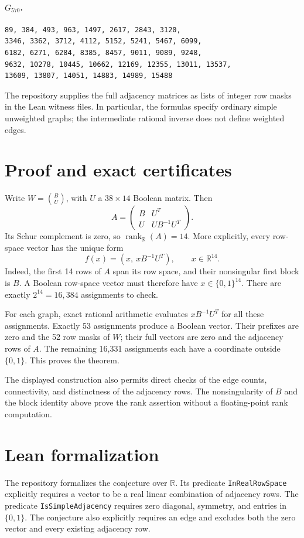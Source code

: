 \documentclass[11pt]{article}
\begin{document}
\paragraph{$G_{570}$.}
\begin{Verbatim}[fontsize=\small]
89, 384, 493, 963, 1497, 2617, 2843, 3120,
3346, 3362, 3712, 4112, 5152, 5241, 5467, 6099,
6182, 6271, 6284, 8385, 8457, 9011, 9089, 9248,
9632, 10278, 10445, 10662, 12169, 12355, 13011, 13537,
13609, 13807, 14051, 14883, 14989, 15488
\end{Verbatim}
The repository supplies the full adjacency matrices as lists of integer row masks in the Lean witness files. In particular, the formulas specify ordinary simple unweighted graphs; the intermediate rational inverse does not define weighted edges.
\newpage

\section*{Proof and exact certificates}
Write $W=\binom{B}{U}$, with $U$ a $38\times14$ Boolean matrix. Then
\[
 A=\begin{pmatrix}B&U^T\\U&UB^{-1}U^T\end{pmatrix}.
\]
Its Schur complement is zero, so $\operatorname{rank}_{\mathbb R}(A)=14$.
More explicitly, every row-space vector has the unique form
\[
                 f(x)=(x,\ xB^{-1}U^T),\qquad x\in\mathbb R^{14}.
\]
Indeed, the first 14 rows of $A$ span its row space, and their nonsingular first block is $B$. A Boolean row-space vector must therefore have $x\in\{0,1\}^{14}$. There are exactly $2^{14}=16,384$ assignments to check.
\par\medskip
For each graph, exact rational arithmetic evaluates $xB^{-1}U^T$ for all these assignments. Exactly 53 assignments produce a Boolean vector. Their prefixes are zero and the 52 row masks of $W$; their full vectors are zero and the adjacency rows of $A$. The remaining 16,331 assignments each have a coordinate outside $\{0,1\}$. This proves the theorem.
\par\medskip
The displayed construction also permits direct checks of the
edge counts, connectivity, and distinctness of the adjacency rows.
The nonsingularity of $B$ and the block identity above prove the
rank assertion without a floating-point rank computation.

\section*{Lean formalization}
The repository formalizes the conjecture over $\mathbb R$.
Its predicate \texttt{InRealRowSpace} explicitly requires a vector
to be a real linear combination of adjacency rows.
The predicate \texttt{IsSimpleAdjacency} requires zero diagonal,
symmetry, and entries in $\{0,1\}$.
The conjecture also explicitly requires an edge and excludes both
the zero vector and every existing adjacency row.
\end{document}
